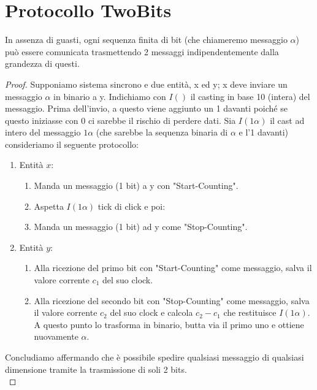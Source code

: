 \section{Protocollo TwoBits}

\begin{theorem}
    In assenza di guasti, ogni sequenza finita di bit (che chiameremo
    messaggio $\alpha$) può essere comunicata trasmettendo 2 messaggi
    indipendentemente dalla grandezza di questi.
\end{theorem}

\begin{proof}
    Supponiamo
    sistema sincrono e due entità, x ed y; x deve inviare un messaggio $\alpha$ in
    binario a y. Indichiamo con $I()$ il casting in base 10 (intera) del
    messaggio. Prima dell'invio, a questo viene aggiunto un 1 davanti poiché se
    questo iniziasse con 0 ci sarebbe il rischio di perdere dati. Sia $I(1\alpha)$
    il cast ad intero del messaggio $1\alpha$ (che sarebbe la sequenza binaria di
    $\alpha$ e l'1 davanti) consideriamo il seguente protocollo:
    \begin{enumerate}
        \item Entità $x$:
              \begin{enumerate}
                  \item Manda un messaggio (1 bit) a y con "Start-Counting".
                  \item Aspetta $I(1\alpha)$ tick di click e poi:
                  \item Manda un messaggio (1 bit) ad y come "Stop-Counting".
              \end{enumerate}
        \item Entità $y$:
              \begin{enumerate}
                  \item Alla ricezione del primo bit con "Start-Counting" come messaggio,
                        salva il valore corrente $c_1$ del suo clock.
                  \item Alla ricezione del secondo bit con "Stop-Counting" come
                        messaggio, salva il valore corrente $c_2$ del suo clock e calcola $c_2
                            - c_1$ che restituisce $I(1\alpha)$. A questo punto lo trasforma in
                        binario, butta via il primo uno e ottiene nuovamente $\alpha$.
              \end{enumerate}
    \end{enumerate}
    Concludiamo affermando che è possibile spedire qualsiasi messaggio di qualsiasi
    dimensione tramite la trasmissione di soli 2 bits.\\
\end{proof}

